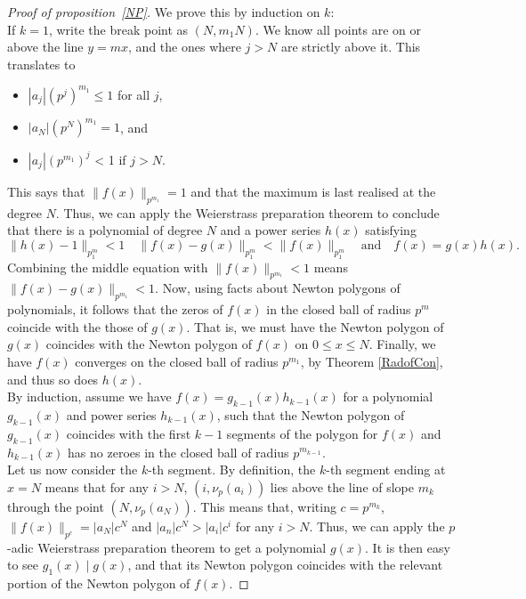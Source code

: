 \begin{proof}[Proof of proposition~\ref{NP}]
    We prove this by induction on $k$:\\
    If $k=1$, write the break point as $(N, m_1 N)$. We know all points are on or above the line
    $y = m x$, and the ones where $j > N$ are strictly above it. This translates to
    \begin{itemize}
        \item $| a_j | (p^j)^{m_1} \leq 1$ for all $j$,
        \item $| a_N | (p^N)^{m_1} = 1$, and
        \item $| a_j | (p^{m_1})^j$ < 1 if $j > N.$
    \end{itemize}
    This says that $\|f(x) \|_{p^{m_1}} = 1$ and that the maximum is last realised at the degree
    $N$. Thus, we can apply the Weierstrass preparation theorem to conclude that there is a
    polynomial of degree $N$ and a power series $h(x)$ satisfying
    \[
    \| h(x) - 1 \|_{p^m_1} < 1 \quad \|f(x) - g(x)\|_{p^m_1} < \|f(x) \|_{p^m_1} \quad \text{and} \quad f(x) = g(x) h(x).
    \]
    Combining the middle equation with $\| f(x) \|_{p^{m_1}} < 1$ means
    $\| f(x) - g(x) \|_{p^{m_1}} < 1$.
    Now, using facts about Newton polygons of polynomials, it follows that the zeros of $f(x)$ in
    the closed ball of radius $p^m$ coincide with the those of $g(x)$. That is, we must have the
    Newton polygon of $g(x)$ coincides with the Newton polygon of $f(x)$ on $0 \leq x \leq N$.
    Finally, we have $f(x)$ converges on the closed ball of radius $p^{m_1}$, by Theorem
    \ref{RadofCon}, and thus so does $h(x).$
    \\
    By induction, assume we have $f(x) = g_{k-1}(x)h_{k-1}(x)$ for a polynomial $g_{k-1}(x)$ and
    power series $h_{k-1}(x)$, such that the Newton polygon of $g_{k-1}(x)$ coincides with the
    first $k-1$ segments of the polygon for $f(x)$ and $h_{k-1}(x)$ has no zeroes in the closed ball
    of radius $p^{m_{k-1}}$.
    \\
    Let us now consider the $k$-th segment. By definition, the $k$-th segment ending at $x = N$
    means that for any $i > N$, $(i, \nu_p (a_i))$ lies above the line of slope $m_k$ through the
    point $(N, \nu_p (a_N))$. This means that, writing $c = p^{m_k}$, $\| f(x) \|_{p^{c}} =
    \lvert a_N \rvert c^N$ and $\lvert a_n \rvert c^N > \lvert a_i \rvert c^i $ for any $i > N$.
    Thus, we can apply the $p$-adic Weierstrass preparation theorem to get a polynomial $g(x)$.
    It is then easy to see $g_1 (x) \mid g(x)$, and that its Newton polygon coincides with the
    relevant portion of the Newton polygon of $f(x).$
\end{proof}


